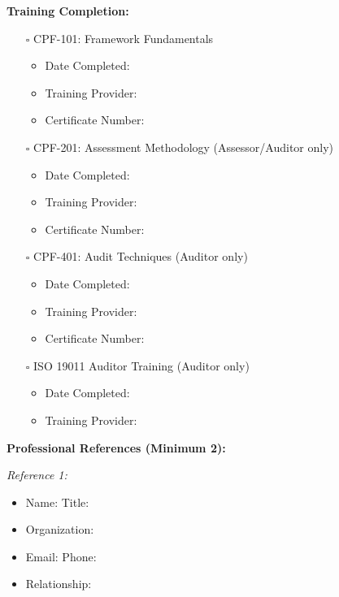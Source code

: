 \documentclass[11pt,a4paper]{article}
\begin{document}
\textbf{Training Completion:}
\begin{itemize}
\item[$\square$] CPF-101: Framework Fundamentals
\begin{itemize}
\item Date Completed: \underline{\hspace{4cm}}
\item Training Provider: \underline{\hspace{6cm}}
\item Certificate Number: \underline{\hspace{6cm}}
\end{itemize}
\item[$\square$] CPF-201: Assessment Methodology (Assessor/Auditor only)
\begin{itemize}
\item Date Completed: \underline{\hspace{4cm}}
\item Training Provider: \underline{\hspace{6cm}}
\item Certificate Number: \underline{\hspace{6cm}}
\end{itemize}
\item[$\square$] CPF-401: Audit Techniques (Auditor only)
\begin{itemize}
\item Date Completed: \underline{\hspace{4cm}}
\item Training Provider: \underline{\hspace{6cm}}
\item Certificate Number: \underline{\hspace{6cm}}
\end{itemize}
\item[$\square$] ISO 19011 Auditor Training (Auditor only)
\begin{itemize}
\item Date Completed: \underline{\hspace{4cm}}
\item Training Provider: \underline{\hspace{6cm}}
\end{itemize}
\end{itemize}

\textbf{Professional References (Minimum 2):}

\textit{Reference 1:}
\begin{itemize}
\item Name: \underline{\hspace{8cm}} Title: \underline{\hspace{5cm}}
\item Organization: \underline{\hspace{10cm}}
\item Email: \underline{\hspace{8cm}} Phone: \underline{\hspace{5cm}}
\item Relationship: \underline{\hspace{10cm}}
\end{itemize}
\end{document}
